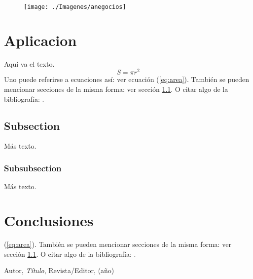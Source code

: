 \begin{figure}[htb]
\begin{center}
\texttt{[image: ./Imagenes/anegocios]}
\end{center}
\end{figure}

\section{Aplicacion}

Aquí va el texto.
\begin{equation}\label{eq:area}
  S = \pi r^2
\end{equation}
Uno puede referirse a ecuaciones así: ver ecuación (\ref{eq:area}).
También se pueden mencionar secciones de la misma forma: ver sección
\ref{sec:nada}. O citar algo de la bibliografía: \cite{Cd94}.




\subsection{Subsection}\label{sec:nada}

Más texto.

\subsubsection{Subsubsection}\label{sec:nada2}

Más texto.


\section{Conclusiones}

(\ref{eq:area}).
También se pueden mencionar secciones de la misma forma: ver sección
\ref{sec:nada}. O citar algo de la bibliografía: \cite{Cd94}.


\begin{thebibliography}{99}

 Autor, \emph{Título}, Revista/Editor, (año)

\end{thebibliography}



